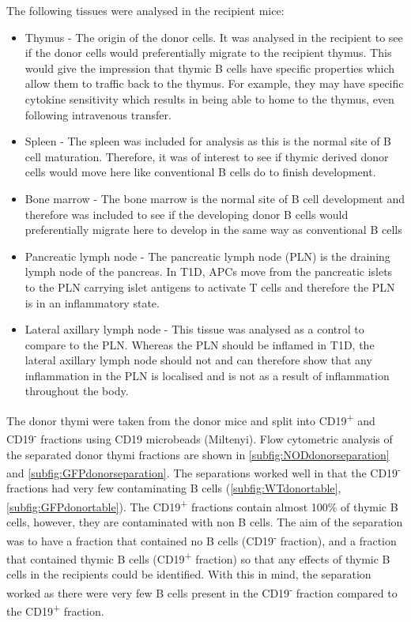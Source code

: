 The following tissues were analysed in the recipient mice:
\begin{itemize}
\item Thymus - The origin of the donor cells. It was analysed in the recipient to see if the donor cells would preferentially migrate to the recipient thymus.
This would give the impression that thymic B cells have specific properties which allow them to traffic back to the thymus.
For example, they may have specific cytokine sensitivity which results in being able to home to the thymus, even following intravenous transfer.
\item Spleen - The spleen was included for analysis as this is the normal site of B cell maturation.
Therefore, it was of interest to see if thymic derived donor cells would move here like conventional B cells do to finish development.
\item Bone marrow - The bone marrow is the normal site of B cell development and therefore was included to see if the developing donor B cells would preferentially migrate here to develop in the same way as conventional B cells
\item Pancreatic lymph node - The pancreatic lymph node (PLN) is the draining lymph node of the pancreas.
In T1D, APCs move from the pancreatic islets to the PLN carrying islet antigens to activate T cells and therefore the PLN is in an inflammatory state.
\item Lateral axillary lymph node - This tissue was analysed as a control to compare to the PLN.
Whereas the PLN should be inflamed in T1D, the lateral axillary lymph node should not and can therefore show that any inflammation in the PLN is localised and is not as a result of inflammation throughout the body.
\end{itemize}

The donor thymi were taken from the donor mice and split into CD19\textsuperscript{+} and CD19\textsuperscript{-} fractions using CD19 microbeads (Miltenyi).
Flow cytometric analysis of the separated donor thymi fractions are shown in \cref{subfig:NODdonorseparation} and \cref{subfig:GFPdonorseparation}.
The separations worked well in that the CD19\textsuperscript{-} fractions had very few contaminating B cells (\cref{subfig:WTdonortable}, \cref{subfig:GFPdonortable}).
The CD19\textsuperscript{+} fractions contain almost 100\% of thymic B cells, however, they are contaminated with non B cells.
The aim of the separation was to have a fraction that contained no B cells (CD19\textsuperscript{-} fraction), and a fraction that contained thymic B cells (CD19\textsuperscript{+} fraction) so that any effects of thymic B cells in the recipients could be identified.
With this in mind, the separation worked as there were very few B cells present in the CD19\textsuperscript{-} fraction compared to the CD19\textsuperscript{+} fraction.

